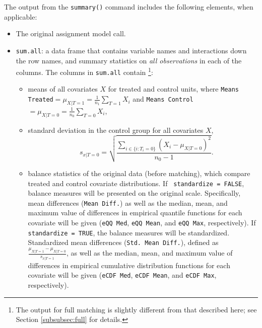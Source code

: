 The output from the \texttt{summary()} command includes the following
elements, when applicable:
\begin{itemize}
\item The original assignment model call.
\item \texttt{sum.all}: a data frame that contains variable names and
  interactions down the row names, and summary statistics on \emph{all
    observations} in each of the columns.  The columns in
  \texttt{sum.all} contain \footnote{The output for full matching is
    slightly different from that described here; see Section
    \ref{subsubsec:full} for details.}:
  \begin{itemize}
  \item means of all covariates $X$ for treated and control units,
    where \texttt{Means Treated}$= \mu_{X|T=1} = \frac{1}{n_1}
    \sum_{T=1} X_i$ and \texttt{Means Control}$= \mu_{X|T=0} =
    \frac{1}{n_0} \sum_{T=0} X_i$,
 \item standard deviation in the control group for all covariates $X$,  
        $$\quad s_{x|T=0} = \sqrt{\frac{\sum_{i \in \{i: T_i=0\}}
        (X_i - \mu_{X|T=0})^2}{n_0-1} }.$$
  \item balance statistics of the original data (before matching),
    which compare treated and control covariate distributions. If {\tt
      standardize = FALSE}, balance measures will be presented on the
    original scale. Specifically, mean differences (\texttt{Mean
      Diff.}) as well as the median, mean, and maximum value of
    differences in empirical quantile functions for each covariate
    will be given (\texttt{eQQ Med}, \texttt{eQQ Mean}, and
    \texttt{eQQ Max}, respectively). If {\tt standardize = TRUE}, the
    balance measures will be standardized.  Standardized mean
    differences (\texttt{Std. Mean Diff.}), defined as
    $\frac{\mu_{X|T=1} - \mu_{X|T=0}}{s_{x|T=1}}$, as well as the
    median, mean, and maximum value of differences in empirical
    cumulative distribution functions for each covariate will be given
    (\texttt{eCDF Med}, \texttt{eCDF Mean}, and \texttt{eCDF Max},
    respectively).
  \end{itemize}
  

\end{itemize}
